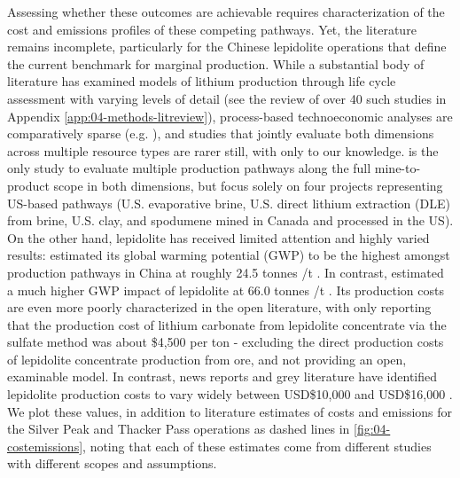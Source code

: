 Assessing whether these outcomes are achievable requires characterization of the cost and emissions profiles of these competing pathways. Yet, the literature remains incomplete, particularly for the Chinese lepidolite operations that define the current benchmark for marginal production. While a substantial body of literature has examined models of lithium production through life cycle assessment with varying levels of detail (see the review of over 40 such studies in Appendix \ref{app:04-methods-litreview}), process-based technoeconomic analyses are comparatively sparse (e.g.  \cite{wesselkaemperOptimizationProcessingCosts2025, warrenTechnoEconomicAnalysisLithium2021}), and studies that jointly evaluate both dimensions across multiple resource types are rarer still, with only \citet{mousavinezhadNextLithiumBoom2025, gaoLithiumExtractionHard2023} to our knowledge. \citet{mousavinezhadNextLithiumBoom2025} is the only study to evaluate multiple production pathways along the full mine-to-product scope in both dimensions, but focus solely on four projects representing US-based pathways (U.S. evaporative brine, U.S. direct lithium extraction (DLE) from brine, U.S. clay, and spodumene mined in Canada and processed in the US). On the other hand, lepidolite has received limited attention and highly varied results: \citet{liuCarbonFootprintBatteryGrade2025} estimated its global warming potential (GWP) to be the highest amongst production pathways in China at roughly 24.5 tonnes /t . In contrast, \citet{wangLifeCycleEnvironmental2026} estimated a much higher GWP impact of lepidolite at 66.0 tonnes /t . Its production costs are even more poorly characterized in the open literature, with only \citet{gaoLithiumExtractionHard2023} reporting that the production cost of lithium carbonate from lepidolite concentrate via the sulfate method was about \$4,500 per ton  - excluding the direct production costs of lepidolite concentrate production from ore, and not providing an open, examinable model. In contrast, news reports and grey literature have identified lepidolite production costs to vary widely between USD\$10,000 and USD\$16,000 \cite{atkinsonLithiumPriceReversion2023, liuChinaLithiumBoom2024, jamasmieCATLCutLithium2024}. We plot these values, in addition to literature estimates of costs and emissions for the Silver Peak and Thacker Pass operations as dashed lines in \ref{fig:04-costemissions}, noting that each of these estimates come from different studies with different scopes and assumptions. 

